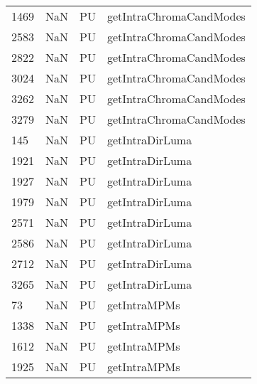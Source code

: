 \begin{tabular}{llll}
1469 &                   NaN &                         PU &                   getIntraChromaCandModes \\
2583 &                   NaN &                         PU &                   getIntraChromaCandModes \\
2822 &                   NaN &                         PU &                   getIntraChromaCandModes \\
3024 &                   NaN &                         PU &                   getIntraChromaCandModes \\
3262 &                   NaN &                         PU &                   getIntraChromaCandModes \\
3279 &                   NaN &                         PU &                   getIntraChromaCandModes \\
145  &                   NaN &                         PU &                           getIntraDirLuma \\
1921 &                   NaN &                         PU &                           getIntraDirLuma \\
1927 &                   NaN &                         PU &                           getIntraDirLuma \\
1979 &                   NaN &                         PU &                           getIntraDirLuma \\
2571 &                   NaN &                         PU &                           getIntraDirLuma \\
2586 &                   NaN &                         PU &                           getIntraDirLuma \\
2712 &                   NaN &                         PU &                           getIntraDirLuma \\
3265 &                   NaN &                         PU &                           getIntraDirLuma \\
73   &                   NaN &                         PU &                              getIntraMPMs \\
1338 &                   NaN &                         PU &                              getIntraMPMs \\
1612 &                   NaN &                         PU &                              getIntraMPMs \\
1925 &                   NaN &                         PU &                              getIntraMPMs \\

\end{tabular}
